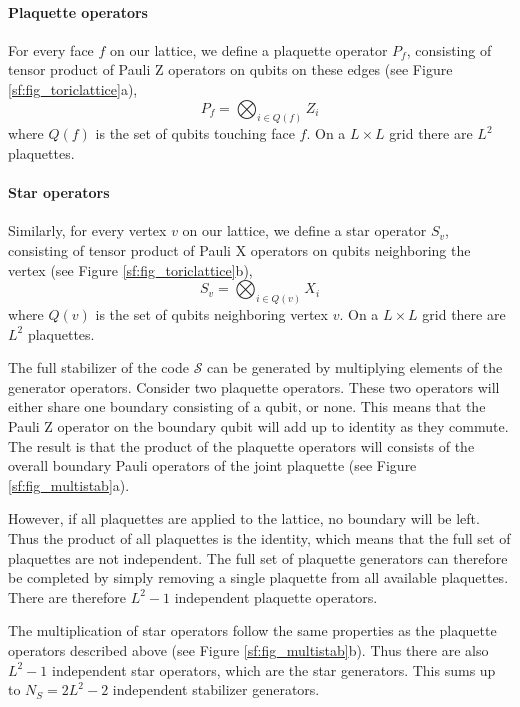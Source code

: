 \paragraph{Plaquette operators}
For every face $f$ on our lattice, we define a plaquette operator $P_f$, consisting of tensor product of Pauli Z operators on qubits on these edges (see Figure \ref{sf:fig_toriclattice}a),
\begin{equation}\label{eq:sf_plaquette}
  P_f = \bigotimes_{i\in Q(f)} Z_i
\end{equation}
where $Q(f)$ is the set of qubits touching face $f$. On a $L\times L$ grid there are $L^2$ plaquettes.

\paragraph{Star operators}

Similarly, for every vertex $v$ on our lattice, we define a star operator $S_v$, consisting of tensor product of Pauli X operators on qubits neighboring the vertex (see Figure \ref{sf:fig_toriclattice}b),
\begin{equation}\label{eq:sf_star}
  S_v = \bigotimes_{i\in Q(v)} X_i
\end{equation}
where $Q(v)$ is the set of qubits neighboring vertex $v$. On a $L\times L$ grid there are $L^2$ plaquettes.

The full stabilizer of the code $\mathcal{S}$ can be generated by multiplying elements of the generator operators. Consider two plaquette operators. These two operators will either share one boundary consisting of a qubit, or none. This means that the Pauli Z operator on the boundary qubit will add up to identity as they commute. The result is that the product of the plaquette operators will consists of the overall boundary Pauli operators of the joint plaquette (see Figure \ref{sf:fig_multistab}a).

However, if all plaquettes are applied to the lattice, no boundary will be left. Thus the product of all plaquettes is the identity, which means that the full set of plaquettes are not independent. The full set of plaquette generators can therefore be completed by simply removing a single plaquette from all available plaquettes. There are therefore $L^2 - 1$ independent plaquette operators.

The multiplication of star operators follow the same properties as the plaquette operators described above (see Figure \ref{sf:fig_multistab}b). Thus there are also $L^2 - 1$ independent star operators, which are the star generators. This sums up to $N_S = 2L^2 - 2$ independent stabilizer generators.

